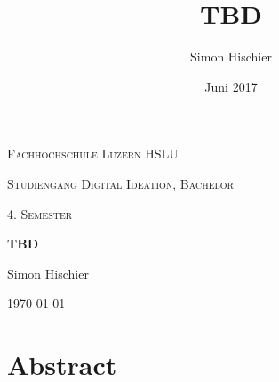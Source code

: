 \documentclass[10pt]{article}
\title{TBD}
\author{Simon Hischier}
\date{Juni 2017}
\begin{document}
\begin{titlepage}
\centering
\vspace{1cm}
	{\scshape\LARGE Fachhochschule Luzern HSLU \par}
	\vspace{1cm}
	{\scshape\Large Studiengang Digital Ideation, Bachelor \par}
	
	{\scshape\Large 4. Semester\par}
	\vspace{1.5cm}
	{\huge\bf TBD\par}
	
	
	\vspace{10cm}
	{\Large Simon Hischier\par}
	\vfill

	{\large \today\par}
	
\end{titlepage}

\renewcommand{\contentsname}{Inhalt}
\tableofcontents
\newpage

\section{Abstract}
\end{document}
